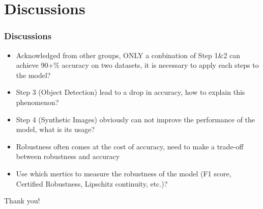 \documentclass{beamer}
\begin{document}
    \section{Discussions}
        \begin{frame}
            \frametitle{Discussions}
            \begin{itemize}
                \item Acknowledged from other groups, ONLY a conbination of Step 1\&2 can achieve 90+\% accuracy on two datasets, it is necessary to apply each steps to the model?
                \item Step 3 (Object Detection) lead to a drop in accuracy, how to explain this phenomenon?
                \item Step 4 (Synthetic Images) obviously can not improve the performance of the model, what is its usage?
                \item Robustness often comes at the cost of accuracy, need to make a trade-off between robustness and accuracy
                \item Use which mertics to measure the robustness of the model (F1 score, Certified Robustness, Lipschitz continuity, etc.)?
            \end{itemize}\par
        \end{frame}
    \begin{frame}
        \Huge{\centerline{Thank you!}}
    \end{frame}
\end{document}
